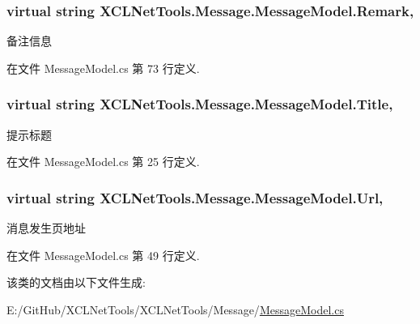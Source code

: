 \subsubsection[{\texorpdfstring{Remark}{Remark}}]{\setlength{\rightskip}{0pt plus 5cm}virtual string X\+C\+L\+Net\+Tools.\+Message.\+Message\+Model.\+Remark\hspace{0.3cm}{\ttfamily [get]}, {\ttfamily [set]}}\hypertarget{class_x_c_l_net_tools_1_1_message_1_1_message_model_a933d98b3a93f2aefeaaf2d66940133a9}{}\label{class_x_c_l_net_tools_1_1_message_1_1_message_model_a933d98b3a93f2aefeaaf2d66940133a9}


备注信息 



在文件 Message\+Model.\+cs 第 73 行定义.

\subsubsection[{\texorpdfstring{Title}{Title}}]{\setlength{\rightskip}{0pt plus 5cm}virtual string X\+C\+L\+Net\+Tools.\+Message.\+Message\+Model.\+Title\hspace{0.3cm}{\ttfamily [get]}, {\ttfamily [set]}}\hypertarget{class_x_c_l_net_tools_1_1_message_1_1_message_model_a2347b5cf1ac7736de79aa94abd252d85}{}\label{class_x_c_l_net_tools_1_1_message_1_1_message_model_a2347b5cf1ac7736de79aa94abd252d85}


提示标题 



在文件 Message\+Model.\+cs 第 25 行定义.

\subsubsection[{\texorpdfstring{Url}{Url}}]{\setlength{\rightskip}{0pt plus 5cm}virtual string X\+C\+L\+Net\+Tools.\+Message.\+Message\+Model.\+Url\hspace{0.3cm}{\ttfamily [get]}, {\ttfamily [set]}}\hypertarget{class_x_c_l_net_tools_1_1_message_1_1_message_model_a35cd14fdd9bbc8dea4c151c00d538755}{}\label{class_x_c_l_net_tools_1_1_message_1_1_message_model_a35cd14fdd9bbc8dea4c151c00d538755}


消息发生页地址 



在文件 Message\+Model.\+cs 第 49 行定义.



该类的文档由以下文件生成\+:\begin{DoxyCompactItemize}
\item 
E\+:/\+Git\+Hub/\+X\+C\+L\+Net\+Tools/\+X\+C\+L\+Net\+Tools/\+Message/\hyperlink{_message_model_8cs}{Message\+Model.\+cs}\end{DoxyCompactItemize}
